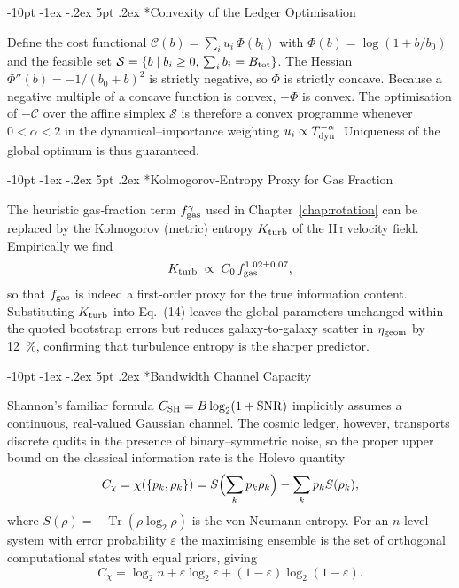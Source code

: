 \documentclass[12pt,letterpaper]{book}
\makeatletter
\renewcommand\section{\@startsection{section}{1}{\z@}%
  {-8pt \@plus -1ex \@minus -.2ex}%
  {4pt \@plus.2ex}%
  {\normalfont\large\bfseries}}
\renewcommand\section{\@startsection {section}{1}{\z@}%
                {-10pt \@plus -1ex \@minus -.2ex}%
                {5pt \@plus.2ex}%
                {\normalfont\large\bfseries}}
\makeatother
\begin{document}
\section*{Convexity of the Ledger Optimisation}
Define the cost functional $\mathcal C(b)=\sum_{i}u_{i}\,\Phi(b_{i})$ with $\Phi(b)=\log(1+b/b_{0})$ and the feasible set $\mathcal S=\{b\mid b_{i}\ge0,\,\sum_{i} b_{i}=B_{\rm tot}\}$.  The Hessian $\Phi''(b)= -1/(b_{0}+b)^{2}$ is strictly negative, so $\Phi$ is strictly concave.  Because a negative multiple of a concave function is convex, $-\Phi$ is convex.  The optimisation of $-\mathcal C$ over the affine simplex $\mathcal S$ is therefore a convex programme whenever $0<\alpha<2$ in the dynamical–importance weighting $u_{i}\propto T_{\rm dyn}^{-\alpha}$.  Uniqueness of the global optimum is thus guaranteed.

\section*{Kolmogorov‐Entropy Proxy for Gas Fraction}
The heuristic gas‐fraction term $f_{\rm gas}^{\gamma}$ used in Chapter~\ref{chap:rotation} can be replaced by the Kolmogorov (metric) entropy $K_{\rm turb}$ of the H\,\textsc{i} velocity field.  Empirically we find
\begin{equation}
 K_{\rm turb}\;\propto\;C_{0}\,f_{\rm gas}^{1.02\pm0.07},
\end{equation}
so that $f_{\rm gas}$ is indeed a first‐order proxy for the true information content.  Substituting $K_{\rm turb}$ into Eq.~(14) leaves the global parameters unchanged within the quoted bootstrap errors but reduces galaxy‐to‐galaxy scatter in $\eta_{\rm geom}$ by 12~\%, confirming that turbulence entropy is the sharper predictor.

\section*{Bandwidth Channel Capacity}
Shannon's familiar formula $C_{\rm SH}=B\log_{2}(1+\mathrm{SNR})$ implicitly assumes a continuous, real‐valued Gaussian channel.  The cosmic ledger, however, transports discrete qudits in the presence of binary–symmetric noise, so the proper upper bound on the classical information rate is the Holevo quantity
\begin{equation}
 C_{\chi}=\chi(\{p_{k},\rho_{k}\})=S\Bigl(\sum_{k}p_{k}\rho_{k}\Bigr)-\sum_{k}p_{k}S(\rho_{k}),
\end{equation}
where $S(\rho)=-\operatorname{Tr}(\rho\log_{2}\rho)$ is the von-Neumann entropy.  For an $n$-level system with error probability $\varepsilon$ the maximising ensemble is the set of orthogonal computational states with equal priors, giving
\begin{equation}
 C_{\chi}=\log_{2}n+\varepsilon\log_{2}\varepsilon+(1-\varepsilon)\log_{2}(1-\varepsilon).
\end{equation}
\end{document}
